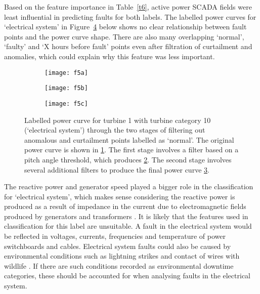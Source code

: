 Based on the feature importance in Table~\ref{t6}, active power SCADA fields were least influential in predicting faults for both labels. The labelled power curves for `electrical system' in Figure~\ref{f5} below shows no clear relationship between fault points and the power curve shape. There are also many overlapping `normal', `faulty' and `X hours before fault' points even after filtration of curtailment and anomalies, which could explain why this feature was less important.

\begin{figure}
    \centering
    \begin{subfigure}[t]{.5\textwidth}
        \centering
        \texttt{[image: f5a]}
        \caption{\label{f5a}}
    \end{subfigure}%
    \begin{subfigure}[t]{.5\textwidth}
        \centering
        \texttt{[image: f5b]}
        \caption{\label{f5b}}
    \end{subfigure}
    \begin{subfigure}[t]{.5\textwidth}
        \centering
        \texttt{[image: f5c]}
        \caption{\label{f5c}}
    \end{subfigure}
    \caption{\label{f5}Labelled power curve for turbine 1 with turbine category 10 (`electrical system') through the two stages of filtering out anomalous and curtailment points labelled as `normal'. The original power curve is shown in \ref{f5a}. The first stage involves a filter based on a pitch angle threshold, which produces \ref{f5b}. The second stage involves several additional filters to produce the final power curve \ref{f5c}.}
\end{figure}

The reactive power and generator speed played a bigger role in the classification for `electrical system', which makes sense considering the reactive power is produced as a result of impedance in the current due to electromagnetic fields produced by generators and transformers \cite{React}. It is likely that the features used in classification for this label are unsuitable. A fault in the electrical system would be reflected in voltages, currents, frequencies \cite{Overb} and temperature of power switchboards and cables. Electrical system faults could also be caused by environmental conditions such as lightning strikes and contact of wires with wildlife \cite{Overb}. If there are such conditions recorded as environmental downtime categories, these should be accounted for when analysing faults in the electrical system.

